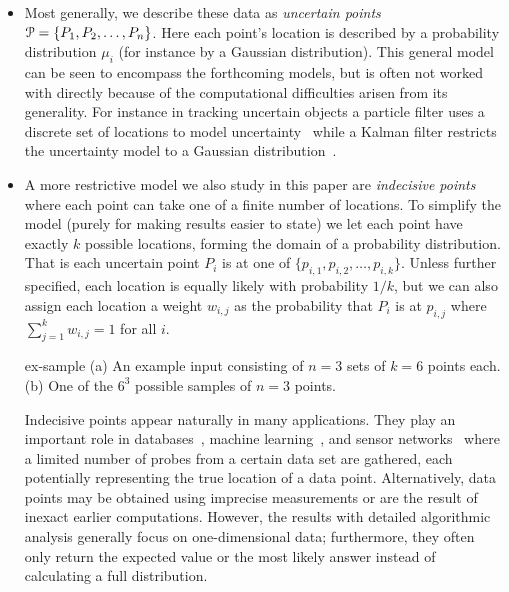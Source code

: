 \documentclass{journal}
\newcommand{\Eu}[1]{\ensuremath{\EuScript{#1}}}
\begin{document}
\begin{itemize}
\item 
Most generally, we describe these data as \emph{uncertain points} $\Eu{P} = \{P_1, P_2, \ldots, P_n\}$.  Here each point's location is described by a probability distribution $\mu_i$ (for instance by a Gaussian distribution).  This general model can be seen to encompass the forthcoming models, but is often not worked with directly because of the computational difficulties arisen from its generality.  For instance in tracking uncertain objects a particle filter uses a discrete set of locations to model uncertainty~\cite{MDFW00} while a Kalman filter restricts the uncertainty model to a Gaussian distribution~\cite{Kal60}.  

\item 
A more restrictive model we also study in this paper are \emph{indecisive points} where each point can take one of a finite number of locations.  To simplify the model (purely for making results easier to state) we let each point have exactly $k$ possible locations, forming the domain of a probability distribution.  That is each uncertain point $P_i$ is at one of $\{p_{i,1}, p_{i,2}, \ldots, p_{i,k}\}$.  Unless further specified, each location is equally likely with probability $1/k$, but we can also assign each location a weight $w_{i,j}$ as the probability that $P_i$ is at $p_{i,j}$ where $\sum_{j=1}^k w_{i,j} = 1$ for all $i$.  

 {ex-sample} {(a) An example input consisting of $n = 3$ sets of $k = 6$ points each. (b) One of the $6^3$ possible samples of $n = 3$ points.}

Indecisive points appear naturally in many applications. They play an important role in databases~\cite{DS04,ABSHNSW06,CM08,CG09,TCXNKP05,ACTY09,CLY09}, machine learning~\cite{BZ04}, and sensor networks~\cite{ZC04} where a limited number of probes from a certain data set are gathered, each potentially representing the true location of a data point.  Alternatively, data points may be obtained using imprecise measurements or are the result of inexact earlier computations.
However, the results with detailed algorithmic analysis generally focus on one-dimensional data; furthermore, they often only return the expected value or the most likely answer instead of calculating a full distribution.  





\end{itemize}
\end{document}
